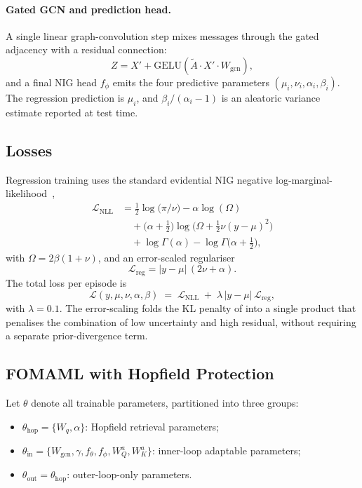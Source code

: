 \documentclass{article}
\theoremstyle{plain}
\theoremstyle{definition}
\theoremstyle{remark}
\begin{document}
\paragraph{Gated GCN and prediction head.}
A single linear graph-convolution step mixes messages through the gated adjacency with a residual connection:
\begin{equation}
    Z = X' + \mathrm{GELU}\!\left(\tilde A \cdot X' \cdot W_{\text{gcn}}\right),
\end{equation}
and a final NIG head $f_\phi$ emits the four predictive parameters $(\mu_i,\nu_i,\alpha_i,\beta_i)$. The regression prediction is $\mu_i$, and $\beta_i/(\alpha_i-1)$ is an aleatoric variance estimate reported at test time.

\subsection{Losses}

Regression training uses the standard evidential NIG negative log-marginal-likelihood~\citep{amini2020deep},
\begin{align}
    \mathcal{L}_{\text{NLL}} &= \tfrac{1}{2}\log\!\bigl(\pi/\nu\bigr) - \alpha\log(\Omega) \nonumber\\
    &\quad + \bigl(\alpha+\tfrac12\bigr)\log\!\bigl(\Omega + \tfrac12\nu (y-\mu)^2\bigr) \nonumber\\
    &\quad + \log\Gamma(\alpha) - \log\Gamma\bigl(\alpha+\tfrac12\bigr),
\end{align}
with $\Omega=2\beta(1+\nu)$, and an error-scaled regulariser
\begin{equation}
    \mathcal{L}_{\text{reg}} = |y-\mu|\,(2\nu+\alpha).
\end{equation}
The total loss per episode is
\begin{equation}
    \mathcal{L}(y,\mu,\nu,\alpha,\beta) \;=\; \mathcal{L}_{\text{NLL}} \;+\; \lambda \,|y-\mu|\,\mathcal{L}_{\text{reg}},
\end{equation}
with $\lambda=0.1$. The error-scaling folds the KL penalty of \citet{amini2020deep} into a single product that penalises the combination of low uncertainty and high residual, without requiring a separate prior-divergence term.

\subsection{FOMAML with Hopfield Protection}

Let $\theta$ denote all trainable parameters, partitioned into three groups:
\begin{itemize}
    \item $\theta_{\text{hop}} = \{W_q,\alpha\}$: Hopfield retrieval parameters;
    \item $\theta_{\text{in}} = \{W_{\text{gcn}},\gamma,f_\theta, f_\phi, W_Q^a, W_K^a\}$: inner-loop adaptable parameters;
    \item $\theta_{\text{out}} = \theta_{\text{hop}}$: outer-loop-only parameters.
\end{itemize}
\end{document}
